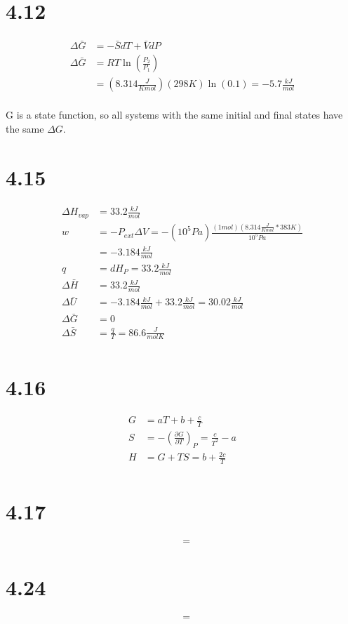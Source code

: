 \documentclass[10pt]{article} %
\begin{document}
\section{4.12}
\begin{align*}
  \Delta \bar{G} &= -\bar{S}dT + \bar{V}dP\\
  \Delta \bar{G} &= RT\ln\left(\frac{P_2}{P_1}\right)\\
  &= (8.314 \frac{J}{K mol})(298K)\ln(0.1) = -5.7 \frac{kJ}{mol}\\
\end{align*}

G is a state function, so all systems with the same initial and final states have the same $\Delta G$.

\section{4.15}
\begin{align*}
  \Delta H_{vap} &= 33.2 \frac{kJ}{mol}\\
  w &= -P_{ext}\Delta V = -(10^5 Pa)\frac{(1 mol)(8.314 \frac{J}{K mol} * 383 K)}{10^5 Pa}\\
  &= -3.184 \frac{kJ}{mol}\\
  q &= dH_P = 33.2 \frac{kJ}{mol}\\
  \Delta \bar{H} &= 33.2 \frac{kJ}{mol}\\
  \Delta \bar{U} &= -3.184 \frac{kJ}{mol} + 33.2 \frac{kJ}{mol} = 30.02 \frac{kJ}{mol}\\
  \Delta \bar{G} &= 0\\
  \Delta \bar{S} &= \frac{q}{T} = 86.6 \frac{J}{mol K}\\
\end{align*}

\section{4.16}
\begin{align*}
  G &= aT + b + \frac{c}{T}\\
  S &= -\left(\frac{\partial G}{\partial T}\right)_P = \frac{c}{T^2} - a\\
  H &= G + TS = b + \frac{2c}{T}\\
\end{align*}

\section{4.17}
\begin{align*}
  &= 
\end{align*}

\section{4.24}
\begin{align*}
  &= 
\end{align*}
\end{document}
